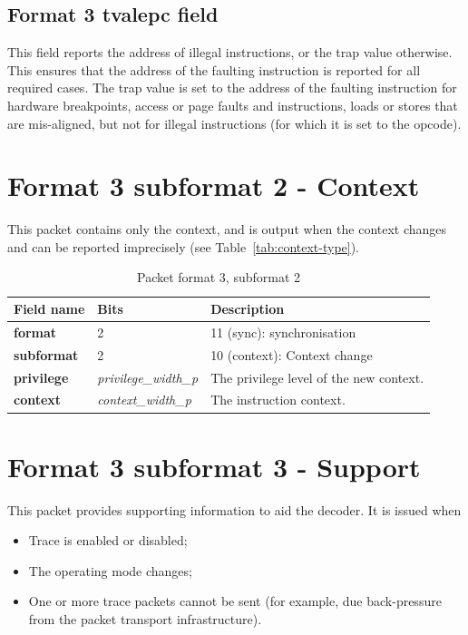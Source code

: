 \subsection{Format 3 \textbf{tvalepc} field}

This field reports the address of illegal instructions, or the trap value otherwise.  This ensures that
the address of the faulting instruction is reported for all required cases.  The trap value 
is set to the address of the faulting instruction for hardware breakpoints, access or page faults and 
instructions, loads or stores that are mis-aligned, but not for illegal instructions (for which it is set to the opcode).

\FloatBarrier
\section{Format 3 subformat 2 - Context} \label{sec:format32}

This packet contains only the context, and is output when the context changes and can be reported imprecisely (see Table~\ref{tab:context-type}).

\begin{table}[htp]
  \centering
  \caption{Packet format 3, subformat 2}
  \label{tab:te_inst3}
  \begin{tabulary}{\textwidth}{|l|p{35mm}|p{90mm}|}
    \hline
    {\bf Field name} & {\bf Bits} & {\bf Description} \\
    \hline
    \textbf{format} & 2 & 11 (sync): synchronisation\\
    \hline
    \textbf{subformat}  & 2 & 10 (context): Context change \\
    \hline
    \textbf{privilege} & \textit {privilege\_width\_p} & 
                The privilege level of the new context.\\
    \hline
    \textbf{context} &  \textit {context\_width\_p} & The instruction context. \\
    \hline
  \end{tabulary}
\end{table}

\section{Format 3 subformat 3 - Support} \label{sec:format33}

This packet provides supporting information to aid the decoder.  It is issued when

\begin{itemize}
  \item Trace is enabled or disabled;
  \item The operating mode changes;
  \item One or more trace packets cannot be sent (for example, due back-pressure from the packet transport infrastructure).
\end{itemize}

